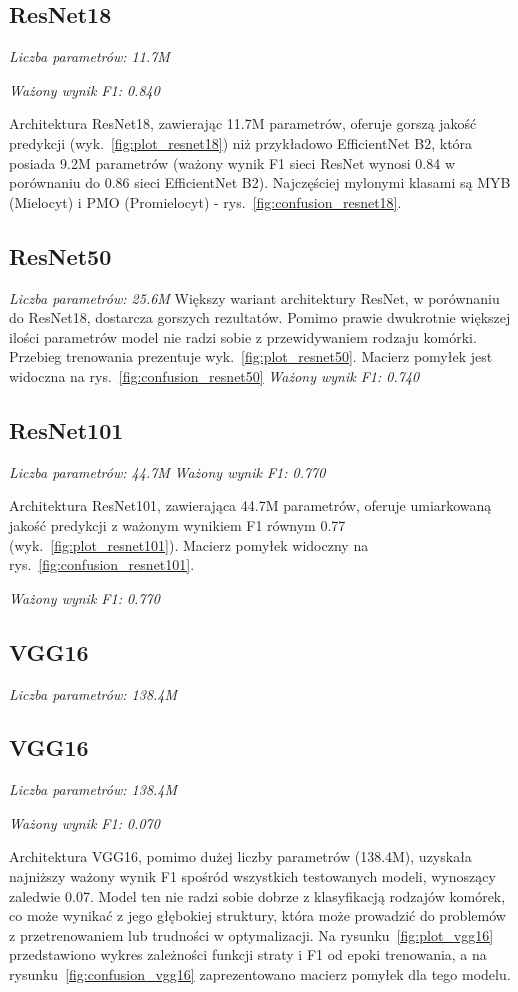 \subsection{ResNet18}
\textit{Liczba parametrów: 11.7M}

\textit{Ważony wynik F1: 0.840}

Architektura ResNet18, zawierając 11.7M parametrów, oferuje gorszą jakość predykcji (wyk.~\ref{fig:plot_resnet18}) niż przykładowo EfficientNet B2, która posiada 9.2M parametrów (ważony wynik F1 sieci ResNet wynosi 0.84 w porównaniu do 0.86 sieci EfficientNet B2).
Najczęściej mylonymi klasami są MYB (Mielocyt) i PMO (Promielocyt) - rys.~\ref{fig:confusion_resnet18}.

\subsection{ResNet50}
\textit{Liczba parametrów: 25.6M}
Większy wariant architektury ResNet, w porównaniu do ResNet18, dostarcza gorszych rezultatów. Pomimo prawie dwukrotnie większej ilości parametrów model nie radzi sobie z przewidywaniem rodzaju komórki. Przebieg trenowania prezentuje wyk.~\ref{fig:plot_resnet50}. Macierz pomyłek jest widoczna na rys.~\ref{fig:confusion_resnet50}
\textit{Ważony wynik F1: 0.740}

\subsection{ResNet101}
\textit{Liczba parametrów: 44.7M}
\textit{Ważony wynik F1: 0.770}

Architektura ResNet101, zawierająca 44.7M parametrów, oferuje umiarkowaną jakość predykcji z ważonym wynikiem F1 równym 0.77 (wyk.~\ref{fig:plot_resnet101}). Macierz pomyłek widoczny na rys.~\ref{fig:confusion_resnet101}.

\textit{Ważony wynik F1: 0.770}

\subsection{VGG16}
\textit{Liczba parametrów: 138.4M}

\subsection{VGG16}
\textit{Liczba parametrów: 138.4M}

\textit{Ważony wynik F1: 0.070}

Architektura VGG16, pomimo dużej liczby parametrów (138.4M), uzyskała najniższy ważony wynik F1 spośród wszystkich testowanych modeli, wynoszący zaledwie 0.07. Model ten nie radzi sobie dobrze z klasyfikacją rodzajów komórek, co może wynikać z jego głębokiej struktury, która może prowadzić do problemów z przetrenowaniem lub trudności w optymalizacji. Na rysunku~\ref{fig:plot_vgg16} przedstawiono wykres zależności funkcji straty i F1 od epoki trenowania, a na rysunku~\ref{fig:confusion_vgg16} zaprezentowano macierz pomyłek dla tego modelu.

